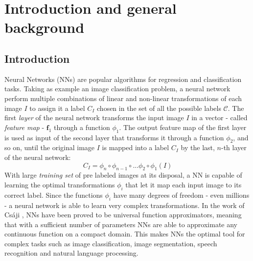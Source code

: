 

\setcounter{page}{1}



\section {Introduction and general background} 

\subsection{Introduction}

Neural Networks (NNs) are popular algorithms for regression and classification tasks. Taking as example an image classification problem, a neural network perform multiple combinations of linear and non-linear transformations of each image $I$ to assign it a label $C_I$ chosen in the set of all the possible labels $\mathcal C$. The first \textit{layer} of the neural network transforms the input image $I$ in a vector - called \textit{feature map} - $\mathbf f_1$ through a function $\phi_1$.  The output feature map of the first layer is used as input of the second layer that transforms it through a function $\phi_2$, and so on, until the original image $I$ is mapped into a label $C_I$ by the last, $n$-th layer of the neural network:
$$C_I = \phi_n \circ \phi_{n-1}\circ ... \phi_2\circ\phi_1 (I)$$
 With large \textit{training set} of pre labeled images at its disposal, a NN is capable of learning the optimal transformations $\phi_i$ that let it map each input image to its correct label. Since the functions $\phi_i$ have many degrees of freedom - even millions - a neural network is able to learn very complex transformations. In the work of Cs\'aji \cite{NN}, NNs have been proved to be universal function approximators, meaning that with a sufficient number of parameters NNs are able to approximate any continuous function on a compact domain. This makes NNs the optimal tool for complex tasks such as image classification, image segmentation, speech recognition and natural language processing.
 
